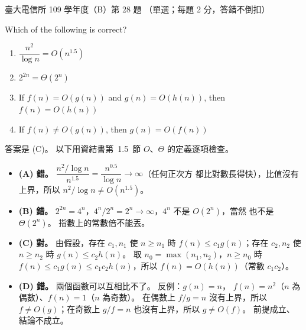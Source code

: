 \begin{pastexam}[label={px:ntu-109-comm-dsa-28}]{臺大電信所 109 學年度（B）第 28 題}
（單選；每題 2 分，答錯不倒扣）

Which of the following is correct?
\begin{enumerate}[label=(\Alph*)]
\item $\dfrac{n^2}{\log n}=O(n^{1.5})$
\item $2^{2n}=\Theta(2^n)$
\item If $f(n)=O(g(n))$ and $g(n)=O(h(n))$, then $f(n)=O(h(n))$
\item If $f(n)\neq O(g(n))$, then $g(n)=O(f(n))$
\end{enumerate}
\end{pastexam}

\begin{pastsoln}
答案是 (C)。 以下用資結書第~1.5~節 $O$、$\Theta$ 的定義逐項檢查。

\begin{itemize}
\item \textbf{(A) 錯。} $\dfrac{n^2/\log n}{n^{1.5}} = \dfrac{n^{0.5}}{\log n} \to \infty$（任何正次方
都比對數長得快），比值沒有上界，所以 $n^2/\log n \ne O(n^{1.5})$。
\item \textbf{(B) 錯。} $2^{2n} = 4^n$，$4^n / 2^n = 2^n \to \infty$，$4^n$ 不是 $O(2^n)$，當然
也不是 $\Theta(2^n)$。 指數上的常數倍不能丟。
\item \textbf{(C) 對。} 由假設，存在 $c_1, n_1$ 使 $n \ge n_1$ 時 $f(n) \le c_1 g(n)$；存在
$c_2, n_2$ 使 $n \ge n_2$ 時 $g(n) \le c_2 h(n)$。 取 $n_0 = \max(n_1, n_2)$，$n \ge n_0$ 時
$f(n) \le c_1 g(n) \le c_1 c_2 h(n)$，所以 $f(n) = O(h(n))$（常數 $c_1 c_2$）。
\item \textbf{(D) 錯。} 兩個函數可以互相比不了。 反例：$g(n) = n$，
$f(n) = n^2$（$n$ 為偶數）、$f(n) = 1$（$n$ 為奇數）。 在偶數上 $f/g = n$ 沒有上界，所以
$f \ne O(g)$；在奇數上 $g/f = n$ 也沒有上界，所以 $g \ne O(f)$。 前提成立、結論不成立。
\end{itemize}
\end{pastsoln}
